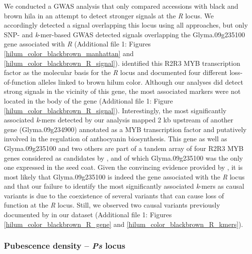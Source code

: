 We conducted a GWAS analysis that only compared accessions with black and brown
hila in an attempt to detect stronger signals at the \textit{R} locus.  We
accordingly detected a signal overlapping this locus using all approaches, but
only SNP- and \textit{k}-mer-based GWAS detected signals overlapping the
Glyma.09g235100 gene associated with \textit{R} (Additional file 1: Figures
\ref{hilum_color_blackbrown_manhattan} and \ref{hilum_color_blackbrown_R_signal}).
\cite{gillman2011} identified this R2R3 MYB transcription factor as the
molecular basis for the \textit{R} locus and documented four different
loss-of-function alleles linked to brown hilum color. Although our analyses did
detect strong signals in the vicinity of this gene, the most associated markers
were not located in the body of the gene (Additional file 1: Figure
\ref{hilum_color_blackbrown_R_signal}).  Interestingly, the most significantly
associated \emph{k}-mers detected by our analysis mapped 2 kb upstream of
another gene (Glyma.09g234900) annotated as a MYB transcription factor and
putatively involved in the regulation of anthocyanin biosynthesis. This gene as
well as Glyma.09g235100 and two others are part of a tandem array of four R2R3
MYB genes considered as candidates by \cite{gillman2011}, and of which
Glyma.09g235100 was the only one expressed in the seed coat. Given the
convincing evidence provided by \cite{gillman2011}, it is most likely that
Glyma.09g235100 is indeed the gene associated with the \emph{R} locus and that
our failure to identify the most significantly associated \emph{k}-mers as
causal variants is due to the coexistence of several variants that can cause
loss of function at the \emph{R} locus.  Still, we observed two causal variants
previously documented by \cite{gillman2011} in our dataset (Additional file 1: Figures
\ref{hilum_color_blackbrown_R_gene} and \ref{hilum_color_blackbrown_R_kmers}). 

\subsubsection*{Pubescence density -- \textit{Ps} locus}
\label{sv-gwas-main-results-pubescence-density-ps}

